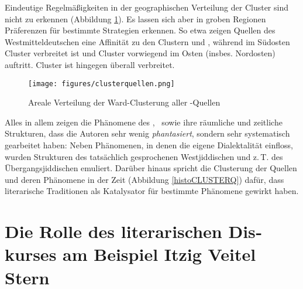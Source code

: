 
Eindeutige Regelmäßigkeiten in der geographischen Verteilung der Cluster sind nicht zu erkennen (Abbildung \ref{karteplotcluster}). Es lassen sich aber in groben Regionen Präferenzen für bestimmte Strategien erkennen. So etwa zeigen Quellen des Westmitteldeutschen eine Affinität zu den Clustern  und , während im Südosten Cluster  verbreitet ist und Cluster  vorwiegend im Osten (insbes. Nordosten) auftritt. Cluster  ist hingegen überall verbreitet.

\begin{figure}
\centering
\texttt{[image: figures/clusterquellen.png]}
		\caption{\label{karteplotcluster} Areale Verteilung der Ward-Clusterung aller -Quellen}
	\end{figure}



\largerpage
Alles in allem zeigen die Phänomene des , \,%
 sowie ihre räumliche und zeitliche Strukturen, dass die Autoren sehr wenig \textit{phantasiert}, sondern sehr systematisch gearbeitet haben: Neben Phänomenen, in denen die eigene Dialektalität einfloss, wurden Strukturen des tatsächlich gesprochenen Westjiddischen und z.\,T. des Übergangsjiddischen emuliert. Darüber hinaus spricht die Clusterung der Quellen und deren Phänomene in der Zeit (Abbildung \ref{histoCLUSTERQ}) dafür, dass literarische Traditionen als Katalysator für bestimmte Phänomene gewirkt haben.

	

 \section{Die Rolle des literarischen Dis­kurses am Beispiel Itzig Veitel Stern}\label{IVS}

